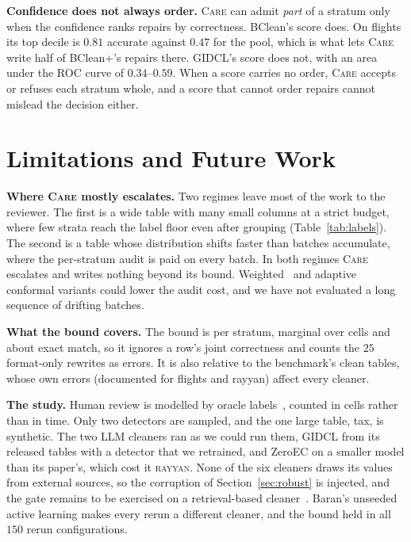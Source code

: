 \documentclass[sigconf, nonacm, balance=false]{acmart}
\theoremstyle{remark}
\begin{document}
\textbf{Confidence does not always order.} \textsc{Care} can admit \emph{part} of a
stratum only when the confidence ranks repairs by correctness. BClean's score does. On
flights its top decile is $0.81$ accurate against $0.47$ for the pool, which is what
lets \textsc{Care} write half of BClean+'s repairs there. GIDCL's score does not, with
an area under the ROC curve of $0.34$--$0.59$. When a score carries no order,
\textsc{Care} accepts or refuses each stratum whole, and a score that cannot order
repairs cannot mislead the decision either.

\section{Limitations and Future Work}
\label{sec:limits}

\textbf{Where \textsc{Care} mostly escalates.} Two regimes leave most of the work to
the reviewer. The first is a wide table with many small columns at a strict budget, where
few strata reach the label floor even after grouping (Table~\ref{tab:labels}). The
second is a table whose distribution shifts faster than batches accumulate, where the
per-stratum audit is paid on every batch. In both regimes
\textsc{Care} escalates and writes nothing beyond its bound. Weighted~\cite{10.48550/arxiv.1904.06019} and
adaptive~\cite{10.48550/arxiv.2106.00170} conformal variants could lower the audit
cost, and we have not evaluated a long sequence of drifting batches.

\textbf{What the bound covers.} The bound is per stratum, marginal over cells and about
exact match, so it ignores a row's joint correctness and counts the $25$ format-only
rewrites as errors. It is also relative to the benchmark's clean tables, whose own
errors (documented for flights and rayyan) affect every cleaner.

\textbf{The study.} Human review is modelled by oracle
labels~\cite{10.14778/1952376.1952378, 10.14778/2994509.2994514}, counted in cells
rather than in time. Only two detectors are sampled, and the one large table, tax, is
synthetic. The two LLM cleaners ran as we could run them, GIDCL from its released
tables with a detector that we retrained, and ZeroEC on a smaller model than its
paper's, which cost it \textsc{rayyan}. None of the six cleaners draws its values
from external sources, so the corruption of Section~\ref{sec:robust} is injected, and
the gate remains to be exercised on a retrieval-based
cleaner~\cite{10.14778/3685800.3685890}. Baran's unseeded active learning makes every
rerun a different cleaner, and the bound held in all $150$ rerun configurations.
\end{document}
